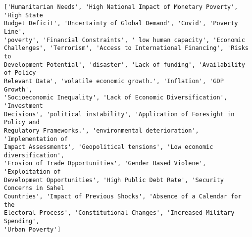 \documentclass[11pt]{article}
\makeatletter
\newcommand{\boxspacing}{\kern\kvtcb@left@rule\kern\kvtcb@boxsep}
\newcommand{\prompt}[4]{
        {\ttfamily\llap{{\color{#2}[#3]:\hspace{3pt}#4}}\vspace{-\baselineskip}}
    }
\makeatother
\begin{document}
    \begin{Verbatim}[commandchars=\\\{\}]
['Humanitarian Needs', 'High National Impact of Monetary Poverty', 'High State
Budget Deficit', 'Uncertainty of Global Demand', 'Covid', 'Poverty Line',
'poverty', 'Financial Constraints', ' low human capacity', 'Economic
Challenges', 'Terrorism', 'Access to International Financing', 'Risks to
Development Potential', 'disaster', 'Lack of funding', 'Availability of Policy-
Relevant Data', 'volatile economic growth.', 'Inflation', 'GDP Growth',
'Socioeconomic Inequality', 'Lack of Economic Diversification', 'Investment
Decisions', 'political instability', 'Application of Foresight in Policy and
Regulatory Frameworks.', 'environmental deterioration', 'Implementation of
Impact Assessments', 'Geopolitical tensions', 'Low economic diversification',
'Erosion of Trade Opportunities', 'Gender Based Violene', 'Exploitation of
Development Opportunities', 'High Public Debt Rate', 'Security Concerns in Sahel
Countries', 'Impact of Previous Shocks', 'Absence of a Calendar for the
Electoral Process', 'Constitutional Changes', 'Increased Military Spending',
'Urban Poverty']
    \end{Verbatim}

    \begin{tcolorbox}[breakable, size=fbox, boxrule=1pt, pad at break*=1mm,colback=cellbackground, colframe=cellborder]
\prompt{In}{incolor}{ }{\boxspacing}
\begin{Verbatim}[commandchars=\\\{\}]

\end{Verbatim}
\end{tcolorbox}


    
    
    
\end{document}
